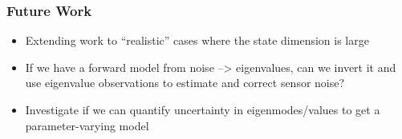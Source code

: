 \documentclass[9pt]{beamer}
\begin{document}
\begin{frame}
\frametitle{Future Work}
\label{sec-4-4}

\begin{itemize}
\item Extending work to ``realistic'' cases where the state dimension is large
\item If we have a forward model from noise --> eigenvalues, can we
  invert it and use eigenvalue observations to estimate and correct
  sensor noise?
\item Investigate if we can quantify uncertainty in eigenmodes/values to
  get a parameter-varying model
\end{itemize}
\end{frame}
\end{document}
